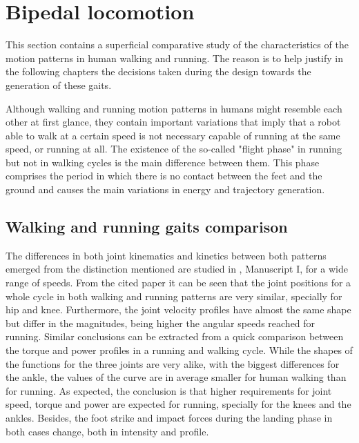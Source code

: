
\section{Bipedal locomotion} %
\label{sec:bipedal_walking_and_running_gaits}
This section contains a superficial comparative study of the characteristics of the motion patterns in human walking and running.
The reason is to help justify in the following chapters the decisions taken during the design towards the generation of these gaits.

Although walking and running motion patterns in humans might resemble each other at first glance, they contain important variations that imply that a robot able to walk at a certain speed is not necessary capable of running at the same speed, or running at all.
The existence of the so-called "flight phase" in running but not in walking cycles is the main difference between them.
This phase comprises the period in which there is no contact between the feet and the ground and causes the main variations in energy and trajectory generation.

\subsection{Walking and running gaits comparison} %
\label{sub:walk_and_run_comparison}
The differences in both joint kinematics and kinetics between both patterns emerged from the distinction mentioned are studied in \cite{grimmer}, Manuscript I, for a wide range of speeds.
From the cited paper it can be seen that the joint positions for a whole cycle in both walking and running patterns are very similar, specially for hip and knee.
Furthermore, the joint velocity profiles have almost the same shape but differ in the magnitudes, being higher the angular speeds reached for running.
Similar conclusions can be extracted from a quick comparison between the torque and power profiles in a running and walking cycle.
While the shapes of the functions for the three joints are very alike, with the biggest differences for the ankle, the values of the curve are in average smaller for human walking than for running.
As expected, the conclusion is that higher requirements for joint speed, torque and power are expected for running, specially for the knees and the ankles.
Besides, the foot strike and impact forces during the landing phase in both cases change, both in intensity and profile.

